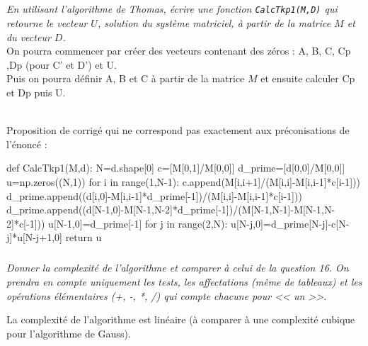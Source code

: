 \documentclass[10pt,fleqn]{article} %
\begin{document}
\subparagraph{}
\textit{En utilisant l'algorithme de Thomas, écrire une fonction \texttt{CalcTkp1(M,D)} 
qui retourne le vecteur $U$, solution du système matriciel, à partir de la matrice 
$M$ et du vecteur $D$.}\\

On pourra commencer par créer  des vecteurs contenant des zéros :
 A, B, C, Cp ,Dp (pour C' et D') et U.\\
 Puis on pourra  définir A, B et C à partir de la matrice $M$ et ensuite calculer Cp et Dp puis U.

\ifprof
\begin{corrige}
~\\
Proposition de corrigé qui ne correspond pas exactement aux préconisations de l'énoncé :

\begin{python}
def CalcTkp1(M,d):
    N=d.shape[0]
    c=[M[0,1]/M[0,0]]
    d_prime=[d[0,0]/M[0,0]]
    u=np.zeros((N,1))
    for i in range(1,N-1):
        c.append(M[i,i+1]/(M[i,i]-M[i,i-1]*c[i-1]))
        d_prime.append((d[i,0]-M[i,i-1]*d_prime[-1])/(M[i,i]-M[i,i-1]*c[i-1]))
    d_prime.append((d[N-1,0]-M[N-1,N-2]*d_prime[-1])/(M[N-1,N-1]-M[N-1,N-2]*c[-1]))
    u[N-1,0]=d_prime[-1]
    for j in range(2,N):
        u[N-j,0]=d_prime[N-j]-c[N-j]*u[N-j+1,0]
    return u
\end{python}
\end{corrige}
\else
\fi

\subparagraph{}
\textit{Donner la complexité de l'algorithme et comparer à celui de la question 16. 
On prendra en compte uniquement les tests, les affectations (même de tableaux)
 et les opérations élémentaires (+, -, *, /) qui compte chacune pour << un >>.}\\

\ifprof
\begin{corrige}
La complexité de l'algorithme est linéaire (à comparer à une complexité cubique pour l'algorithme de Gauss).
\end{corrige}
\else
\fi
\end{document}
